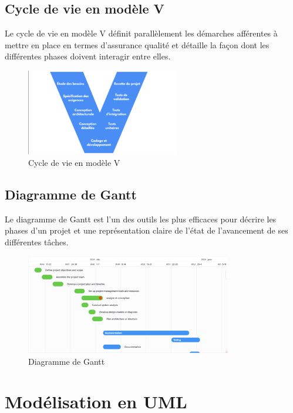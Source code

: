 \documentclass[12pt,a4paper]{report}
\begin{document}
	\subsection{Cycle de vie en modèle V}
	Le cycle de vie en modèle V définit parallèlement les démarches afférentes à mettre en place en termes d'assurance qualité et détaille la façon dont les différentes phases doivent interagir entre elles.
	
	\begin{figure}[H]
		\centering
		\includegraphics[width=0.6\textwidth]{images/cycle_vie.png}
		\caption{Cycle de vie en modèle V}
		\label{fig:cycle_v}
	\end{figure}
	
	\subsection{Diagramme de Gantt}
	Le diagramme de Gantt est l'un des outils les plus efficaces pour décrire les phases d'un projet et une représentation claire de l'état de l'avancement de ses différentes tâches.
	
	\begin{figure}[H]
		\centering
		\includegraphics[width=0.8\textwidth]{images/diagramme_gant.png}
		\caption{Diagramme de Gantt}
		\label{fig:gantt}
	\end{figure}
	
	\section{Modélisation en UML}
\end{document}
